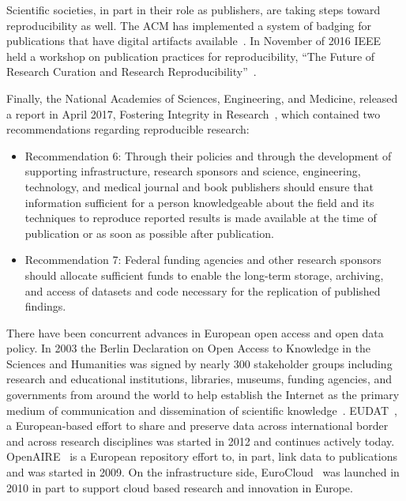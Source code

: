 \documentclass{elsarticle}
\begin{document}
Scientific societies, in part in their role as publishers, are taking steps toward reproducibility as well. The ACM has implemented a system of badging for publications that have digital artifacts available~\cite{victoria13}. In November of 2016 IEEE held a workshop on publication practices for reproducibility, ``The Future of Research Curation and Research Reproducibility''~\cite{victoria14}.

Finally, the National Academies of Sciences, Engineering, and Medicine, released a report in April 2017, Fostering Integrity in Research~\cite{NAP21896}, which contained two recommendations regarding reproducible research:

\begin{itemize}

\item Recommendation 6: Through their policies and through the development of supporting infrastructure, research sponsors and science, engineering, technology, and medical journal and book publishers should ensure that information sufficient for a person knowledgeable about the field and its techniques to reproduce reported results is made available at the time of publication or as soon as possible after publication. 
\item Recommendation 7: Federal funding agencies and other research sponsors should allocate sufficient funds to enable the long-term storage, archiving, and access of datasets and code necessary for the replication of published findings. 

\end{itemize}

There have been concurrent advances in European open access and open data policy. In 2003 the Berlin Declaration on Open Access to Knowledge in the Sciences and Humanities was signed by nearly 300 stakeholder groups including research and educational institutions, libraries, museums, funding agencies, and governments from around the world to help establish the Internet as the primary medium of communication and dissemination of scientific knowledge~\cite{berlindeclaration}.  
EUDAT~\cite{eudat}, a European-based effort to share and preserve data across international border and across research disciplines was started in 2012 and continues actively today.
OpenAIRE~\cite{openaire} is a European repository effort to, in part, link data to publications and was started in 2009. 
On the infrastructure side, EuroCloud~\cite{eurocloud} was launched in 2010 in part to support cloud based research and innovation in Europe.
\end{document}
